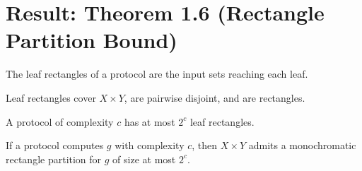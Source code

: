 \chapter{Result: Theorem 1.6 (Rectangle Partition Bound)}

\begin{definition}
  \label{def:leaf_rectangles}
  \leanok
  The leaf rectangles of a protocol are the input sets reaching each leaf.
\end{definition}

\begin{lemma}
  \label{lem:leaf_partition}
  \leanok
  Leaf rectangles cover $X \times Y$, are pairwise disjoint, and are rectangles.
\end{lemma}

\begin{lemma}
  \label{lem:leaf_card}
  \leanok
  A protocol of complexity $c$ has at most $2^c$ leaf rectangles.
\end{lemma}

\begin{theorem}[Theorem 1.6]
  \label{thm:rect_partition}
  \leanok
  If a protocol computes $g$ with complexity $c$, then $X \times Y$ admits a
  monochromatic rectangle partition for $g$ of size at most $2^c$.
\end{theorem}
